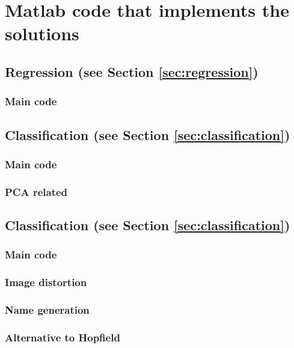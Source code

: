\documentclass[pdftex,12pt,a4paper]{article}
\begin{document}
\section{Matlab code that implements the solutions}
\subsection{Regression (see Section \ref{sec:regression})}
\subsubsection{Main code}

\subsection{Classification (see Section \ref{sec:classification})}
\subsubsection{Main code}

\subsubsection{PCA related}

\subsection{Classification (see Section \ref{sec:classification})}
\subsubsection{Main code}

\subsubsection{Image distortion}

\subsubsection{Name generation}


\subsubsection{Alternative to Hopfield}

\end{document}
